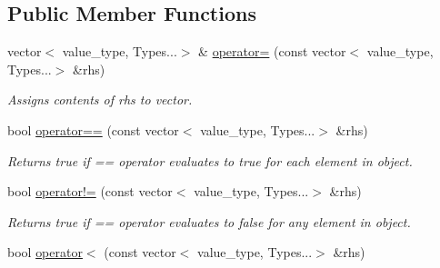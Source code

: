 \subsection*{Public Member Functions}
\begin{DoxyCompactItemize}
\item 
\hypertarget{classheterogeneous_1_1vector_3_01_t_00_01_types_8_8_8_4_a0f383dfb7899f4d8618531a0e9f9c13b}{}vector$<$ value\+\_\+type, Types...$>$ \& \hyperlink{classheterogeneous_1_1vector_3_01_t_00_01_types_8_8_8_4_a0f383dfb7899f4d8618531a0e9f9c13b}{operator=} (const vector$<$ value\+\_\+type, Types...$>$ \&rhs)\label{classheterogeneous_1_1vector_3_01_t_00_01_types_8_8_8_4_a0f383dfb7899f4d8618531a0e9f9c13b}

\begin{DoxyCompactList}\small\item\em Assigns contents of rhs to vector. \end{DoxyCompactList}\item 
\hypertarget{classheterogeneous_1_1vector_3_01_t_00_01_types_8_8_8_4_ae77d43cf53f6da9a34fb1224b332d70a}{}bool \hyperlink{classheterogeneous_1_1vector_3_01_t_00_01_types_8_8_8_4_ae77d43cf53f6da9a34fb1224b332d70a}{operator==} (const vector$<$ value\+\_\+type, Types...$>$ \&rhs)\label{classheterogeneous_1_1vector_3_01_t_00_01_types_8_8_8_4_ae77d43cf53f6da9a34fb1224b332d70a}

\begin{DoxyCompactList}\small\item\em Returns true if == operator evaluates to true for each element in object. \end{DoxyCompactList}\item 
\hypertarget{classheterogeneous_1_1vector_3_01_t_00_01_types_8_8_8_4_adec791592a74b837adfefc67fbd2b684}{}bool \hyperlink{classheterogeneous_1_1vector_3_01_t_00_01_types_8_8_8_4_adec791592a74b837adfefc67fbd2b684}{operator!=} (const vector$<$ value\+\_\+type, Types...$>$ \&rhs)\label{classheterogeneous_1_1vector_3_01_t_00_01_types_8_8_8_4_adec791592a74b837adfefc67fbd2b684}

\begin{DoxyCompactList}\small\item\em Returns true if == operator evaluates to false for any element in object. \end{DoxyCompactList}\item 
\hypertarget{classheterogeneous_1_1vector_3_01_t_00_01_types_8_8_8_4_a9d7bf13744a2af88db99e3658204df0a}{}bool \hyperlink{classheterogeneous_1_1vector_3_01_t_00_01_types_8_8_8_4_a9d7bf13744a2af88db99e3658204df0a}{operator$<$} (const vector$<$ value\+\_\+type, Types...$>$ \&rhs)\label{classheterogeneous_1_1vector_3_01_t_00_01_types_8_8_8_4_a9d7bf13744a2af88db99e3658204df0a}


\end{DoxyCompactItemize}
